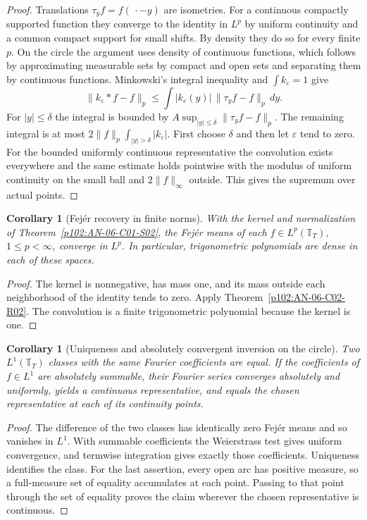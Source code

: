 \documentclass[11pt,oneside,openany]{book}
\newtheorem{corollary}[theorem]{Corollary}
\theoremstyle{definition}
\theoremstyle{remark}
\begin{document}
\begin{proof}
Translations \(\tau_y f=f(\,\cdot-y)\) are isometries. For a continuous compactly supported function they converge to the identity in \(L^p\) by uniform continuity and a common compact support for small shifts. By density they do so for every finite \(p\). On the circle the argument uses density of continuous functions, which follows by approximating measurable sets by compact and open sets and separating them by continuous functions. Minkowski's integral inequality and \(\int k_\varepsilon=1\) give
\[
 \|k_\varepsilon*f-f\|_p
 \le \int |k_\varepsilon(y)|\,\|\tau_y f-f\|_p\,dy.
\]
For \(|y|\le\delta\) the integral is bounded by \(A\sup_{|y|\le\delta}\|\tau_y f-f\|_p\). The remaining integral is at most \(2\|f\|_p\int_{|y|>\delta}|k_\varepsilon|\). First choose \(\delta\) and then let \(\varepsilon\) tend to zero. For the bounded uniformly continuous representative the convolution exists everywhere and the same estimate holds pointwise with the modulus of uniform continuity on the small ball and \(2\|f\|_\infty\) outside. This gives the supremum over actual points.
\end{proof}

\begin{corollary}[Fej\'er recovery in finite norms]
\label{p102:fejer-lp}
With the kernel and normalization of Theorem~\ref{p102:AN-06-C01-S02}, the Fej\'er means of each \(f\in L^p(\mathbb T_T)\), \(1\le p<\infty\), converge in \(L^p\). In particular, trigonometric polynomials are dense in each of these spaces.
\end{corollary}
\begin{proof}
The kernel is nonnegative, has mass one, and its mass outside each neighborhood of the identity tends to zero. Apply Theorem~\ref{p102:AN-06-C02-R02}. The convolution is a finite trigonometric polynomial because the kernel is one.
\end{proof}

\begin{corollary}[Uniqueness and absolutely convergent inversion on the circle]
\label{p102:AN-06-C01-S03}
Two \(L^1(\mathbb T_T)\) classes with the same Fourier coefficients are equal. If the coefficients of \(f\in L^1\) are absolutely summable, their Fourier series converges absolutely and uniformly, yields a continuous representative, and equals the chosen representative at each of its continuity points.
\end{corollary}
\begin{proof}
The difference of the two classes has identically zero Fej\'er means and so vanishes in \(L^1\). With summable coefficients the Weierstrass test gives uniform convergence, and termwise integration gives exactly those coefficients. Uniqueness identifies the class. For the last assertion, every open arc has positive measure, so a full-measure set of equality accumulates at each point. Passing to that point through the set of equality proves the claim wherever the chosen representative is continuous.
\end{proof}
\end{document}

